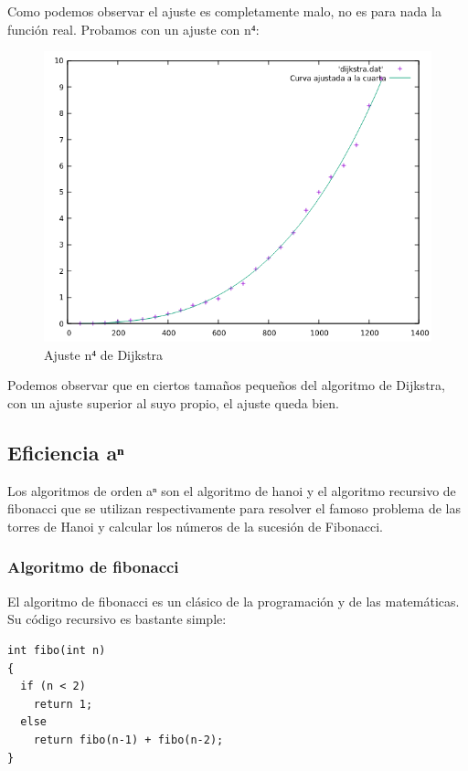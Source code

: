 \documentclass[12pt, spanish]{article}
\begin{document}
Como podemos observar el ajuste es completamente malo, no es para nada la función real. Probamos con un ajuste con n⁴:

\begin{figure}[H]
  \centering
  \includegraphics[scale = 0.7]{AjusteCuartaDijkstra.png}
  \caption{Ajuste n⁴ de Dijkstra}
\end{figure}

Podemos observar que en ciertos tamaños pequeños del algoritmo de Dijkstra, con un ajuste superior al suyo propio, el ajuste queda bien.

\subsection{Eficiencia aⁿ}
Los algoritmos de orden aⁿ son el algoritmo de hanoi y el algoritmo recursivo de fibonacci que se utilizan respectivamente para resolver el famoso problema de las torres de Hanoi y calcular los números de la sucesión de Fibonacci.

\subsubsection{Algoritmo de fibonacci}

El algoritmo de fibonacci es un clásico de la programación y de las matemáticas. Su código recursivo es bastante simple:

\begin{verbatim}
int fibo(int n)
{
  if (n < 2)
    return 1;
  else
    return fibo(n-1) + fibo(n-2);
}
\end{verbatim}
\end{document}

